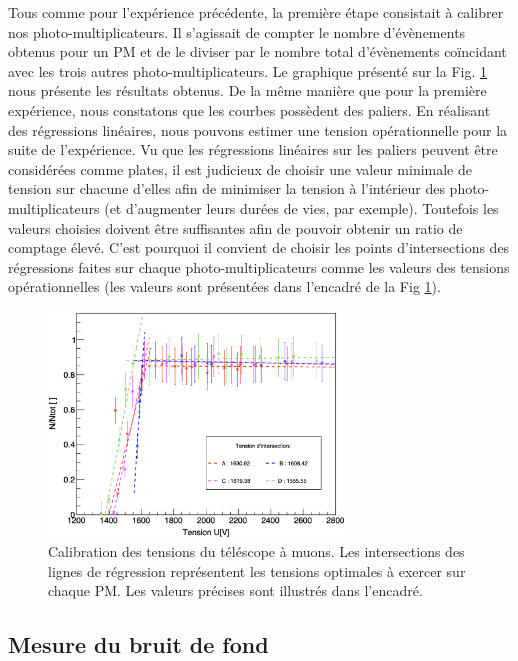 \documentclass[12pt]{article}
\begin{document}
Tous comme pour l'expérience précédente, la première étape consistait à calibrer nos photo-multiplicateurs. Il s'agissait de compter le nombre d'évènements obtenus pour un PM et de le diviser par le nombre total d'évènements coïncidant avec les trois autres photo-multiplicateurs.  Le graphique présenté sur la Fig. \ref{fig:Graph_calib_exp_2} nous présente les résultats obtenus. 
De la même manière que pour la première expérience, nous constatons que les courbes possèdent des paliers. En réalisant des régressions linéaires, nous pouvons estimer une tension opérationnelle pour la suite de l'expérience. Vu que les régressions linéaires sur les paliers peuvent être considérées comme plates, il est judicieux de choisir une valeur minimale de tension sur chacune d'elles afin de minimiser la tension à l'intérieur des photo-multiplicateurs (et d'augmenter leurs durées de vies, par exemple). Toutefois les valeurs choisies doivent être suffisantes afin de pouvoir obtenir un ratio de comptage élevé. C'est pourquoi il convient de choisir les points d'intersections des régressions faites sur chaque photo-multiplicateurs comme les valeurs des tensions opérationnelles (les valeurs sont présentées dans l'encadré de la Fig \ref{fig:Graph_calib_exp_2}).

\begin{figure}[htpb!]
    \centering
    \includegraphics[width=0.7\textwidth]{graphiques/experience2/calibration_exp_2.png}
    \captionsetup{width=0.9\textwidth}
    \caption{Calibration des tensions du téléscope à muons. Les intersections des lignes de régression représentent les tensions optimales à exercer sur chaque PM. Les valeurs précises sont illustrés dans l'encadré.}
    \label{fig:Graph_calib_exp_2}
\end{figure}


\subsection{Mesure du bruit de fond}
\end{document}
